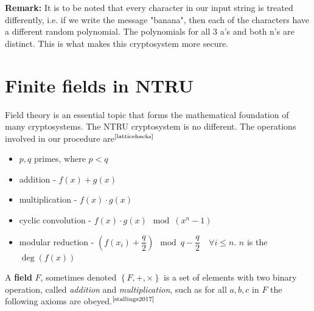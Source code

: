 \documentclass[cryptography,article,submit,moreauthors,pdftex]{Definitions/mdpi}
\begin{document}
\begin{flushleft}
\textbf{Remark:} It is to be noted that every character in our input string is treated differently, i.e. if we write the message "banana", then each of the characters have a different random polynomial. The polynomials for all 3 a's and both n's are distinct. This is what makes this cryptosystem more secure.
\end{flushleft}

\section{Finite fields in NTRU}
\begin{flushleft}
Field theory is an essential topic that forms the mathematical foundation of many cryptosystems. The NTRU cryptosystem is no different. The operations involved in our procedure are$^{\text{\cite{latticehacks}}}$

\begin{itemize}
	\item $p,q$ primes, where $p<q$
	\item addition - $f(x)+g(x)$
	\item multiplication - $f(x)\cdot g(x)$
	\item cyclic convolution - $f(x)\cdot g(x) \mod (x^n-1)$
	\item modular reduction - $\left(f(x_i)+\dfrac q2\right)\mod q - \dfrac q2 \quad \forall i\le n$. $n$ is the $\deg(f(x))$
\end{itemize}
\end{flushleft}

\begin{flushleft}
A \textbf{field} $F$, sometimes denoted $\left\{F,+,\times\right\}$ is a set of elements with two binary operation, called \textit{addition} and \textit{multiplication}, such as for all $a,b,c$ in $F$ the following axioms are obeyed.$^{\text{\cite{stallings2017}}}$
\end{flushleft}
\end{document}
